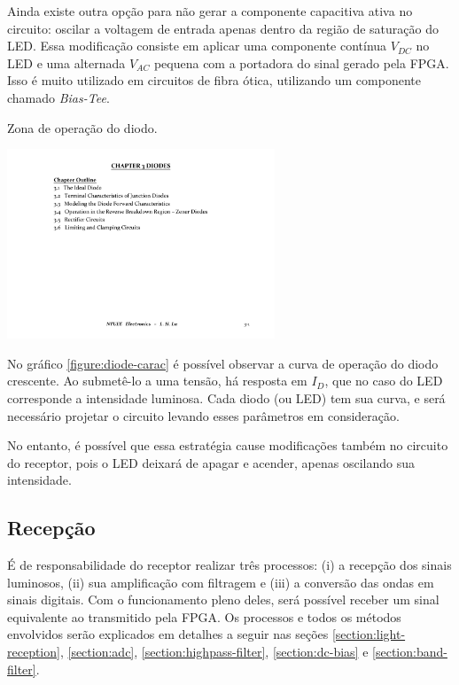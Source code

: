 	Ainda existe outra opção para não gerar a componente capacitiva ativa no circuito: oscilar a voltagem de entrada apenas dentro da região de saturação do LED. Essa modificação consiste em aplicar uma componente contínua $V_{DC}$ no LED e uma alternada $V_{AC}$ pequena com a portadora do sinal gerado pela FPGA. Isso é muito utilizado em circuitos de fibra ótica, utilizando um componente chamado \textit{Bias-Tee}.
	
	\begin{chart}[htb]
		\caption{\label{figure:diode-carac}Zona de operação do diodo.}
		\centering
		\includegraphics[page=5,width=0.6\textwidth, trim={16cm 2.5cm 2cm 12.5cm}, clip]{circuits/Electronics_Ch3.pdf}
	\end{chart}
	
	No gráfico \ref{figure:diode-carac} é possível observar a curva de operação do diodo crescente. Ao submetê-lo a uma tensão, há resposta em $I_{D}$, que no caso do LED corresponde a intensidade luminosa. Cada diodo (ou LED) tem sua curva, e será necessário projetar o circuito levando esses parâmetros em consideração.
	
	No entanto, é possível que essa estratégia cause modificações também no circuito do receptor, pois o LED deixará de apagar e acender, apenas oscilando sua intensidade.	
	
	\subsection{Recepção}
	
	É de responsabilidade do receptor realizar três processos: (i) a recepção dos sinais luminosos, (ii) sua amplificação com filtragem e (iii) a conversão das ondas em sinais digitais. Com o funcionamento pleno deles, será possível receber um sinal equivalente ao transmitido pela FPGA. Os processos e todos os métodos envolvidos serão explicados em detalhes a seguir nas seções \ref{section:light-reception}, \ref{section:adc},  \ref{section:highpass-filter}, \ref{section:dc-bias} e \ref{section:band-filter}.
	

